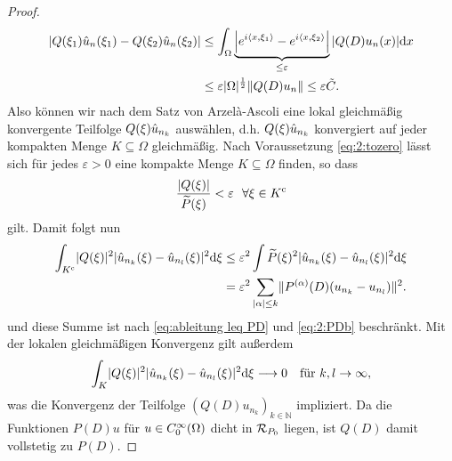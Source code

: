 \begin{proof}
\begin{align}
| Q(\xi_1)\hat{u}_n(\xi_1) - Q(\xi_2)\hat{u}_n(\xi_2)| & \leq \int_{\Omega}  \underbrace{\left| e^{i \langle x,\xi_1\rangle} - e^{i \langle x,\xi_2\rangle} \right| }_{\leq \varepsilon} | Q(D) u_n(x)| \mathrm{d}x 
\\ & \leq \varepsilon |\Omega|^{\frac{1}{2}} \Vert Q(D)u_n \Vert \leq \varepsilon \tilde{C}.
\end{align}
Also können wir nach dem Satz von Arzel\`a-Ascoli eine lokal gleichmäßig konvergente Teilfolge $Q(\xi)\hat{u}_{n_k}$ auswählen, d.h. $Q(\xi)\hat{u}_{n_k}$ konvergiert auf jeder kompakten Menge $K \subseteq \Omega$ gleichmäßig.
Nach Voraussetzung \eqref{eq:2:tozero} lässt sich für jedes $\varepsilon > 0$ eine kompakte Menge $K \subseteq \Omega$ finden, so dass 
\begin{equation}
\frac{\abs{Q(\x)}}{\til{P}(\x)} <\varepsilon \ \ \forall \x \in K^{\mathrm{c}}
\end{equation}
gilt. Damit folgt nun
\begin{align}
\int_{K^{\mathrm c}}\lvert Q(\xi)\rvert^2\lvert\hat{u}_{n_k}(\xi)-\hat{u}_{n_l}(\xi)\rvert^2\mathrm{d}\xi
&\leq\varepsilon^2\int\widetilde{P}(\xi)^2\lvert\hat{u}_{n_k}(\xi)-\hat{u}_{n_l}(\xi)\rvert^2\mathrm{d}\xi\\
&=\varepsilon^2\sum_{|\alpha| \leq k}\lVert P^{(\alpha)}(D)(u_{n_k}-u_{n_l})\rVert^2.\label{eq:2:Kcsum}
\end{align}
und diese Summe ist nach \eqref{eq:ableitung leq PD}
und \eqref{eq:2:PDb} beschränkt.
Mit der lokalen gleichmäßigen Konvergenz gilt außerdem
\begin{equation}
\int_K\lvert Q(\xi)\rvert^2\lvert\hat{u}_{n_k}(\xi)-\hat{u}_{n_l}(\xi)\rvert^2\mathrm{d}\xi\longrightarrow0
\quad\text{für}~ k,l \rightarrow \infty,
\end{equation}
was die Konvergenz der Teilfolge $\left(Q(D)u_{n_k} \right)_{k \in \mathbb{N}}$ impliziert. Da die Funktionen $P(D)u$ für $u\in C^\infty_0(\Omega)$ dicht in $\mathcal R_{P_0}$ liegen, ist $Q(D)$ damit vollstetig zu $P(D)$.


\end{proof}
